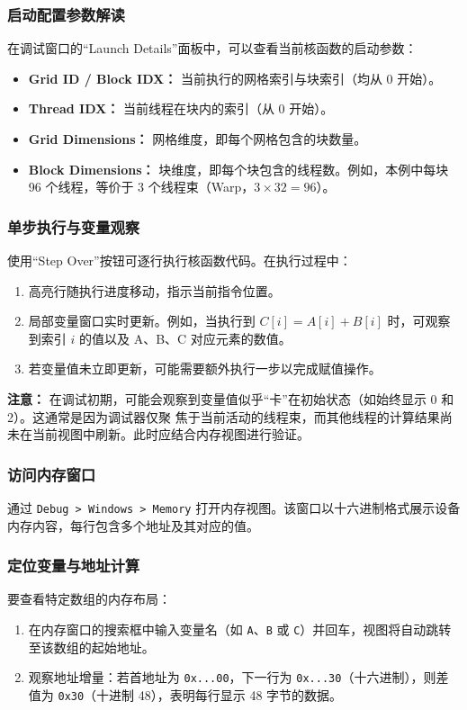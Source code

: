 \subsubsection{启动配置参数解读}
在调试窗口的“Launch Details”面板中，可以查看当前核函数的启动参数：
\begin{itemize}
    \item \textbf{Grid ID / Block IDX：} 当前执行的网格索引与块索引（均从 0 开始）。
    \item \textbf{Thread IDX：} 当前线程在块内的索引（从 0 开始）。
    \item \textbf{Grid Dimensions：} 网格维度，即每个网格包含的块数量。
    \item \textbf{Block Dimensions：} 块维度，即每个块包含的线程数。例如，本例中每块 96 个线程，等价于 3 个线程束（Warp，$3 \times 32 = 96$）。
\end{itemize}

\subsubsection{单步执行与变量观察}
使用“Step Over”按钮可逐行执行核函数代码。在执行过程中：
\begin{enumerate}
    \item 高亮行随执行进度移动，指示当前指令位置。
    \item 局部变量窗口实时更新。例如，当执行到 $C[i] = A[i] + B[i]$ 时，可观察到索引 $i$ 的值以及 A、B、C 对应元素的数值。
    \item 若变量值未立即更新，可能需要额外执行一步以完成赋值操作。
\end{enumerate}

\textbf{注意：} 在调试初期，可能会观察到变量值似乎“卡”在初始状态（如始终显示 0 和 2）。这通常是因为调试器仅聚
焦于当前活动的线程束，而其他线程的计算结果尚未在当前视图中刷新。此时应结合内存视图进行验证。

\subsubsection{访问内存窗口}
通过 \texttt{Debug > Windows > Memory} 打开内存视图。该窗口以十六进制格式展示设备
内存内容，每行包含多个地址及其对应的值。

\subsubsection{定位变量与地址计算}
要查看特定数组的内存布局：
\begin{enumerate}
    \item 在内存窗口的搜索框中输入变量名（如 \texttt{A}、\texttt{B} 或 \texttt{C}）并回车，视图将自动跳转至该数组的起始地址。
    \item 观察地址增量：若首地址为 \texttt{0x...00}，下一行为 \texttt{0x...30}（十六进制），则差值为 \texttt{0x30}（十进制 48），表明每行显示 48 字节的数据。
\end{enumerate}

